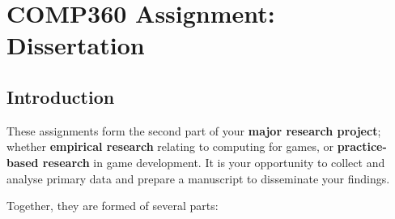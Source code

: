 \chapter{COMP360 Assignment: Dissertation}

\section*{Introduction}

These assignments form the second part of your \textbf{major research project}; whether \textbf{empirical research} relating to computing for games, or \textbf{practice-based research} in game development. It is your opportunity to collect and analyse primary data and prepare a manuscript to disseminate your findings.

Together, they are formed of several parts:

